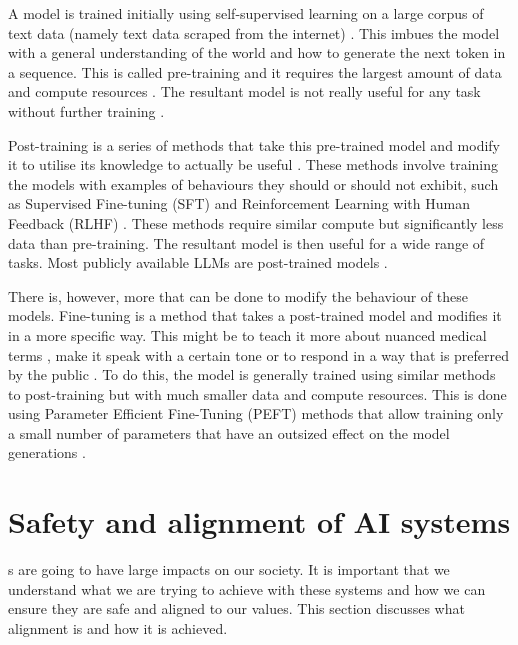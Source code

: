 A model is trained initially using self-supervised learning on a large corpus of text data (namely text data scraped from the internet) \cite{brownLanguageModelsAre2020,Gokaslan2019OpenWeb}. This imbues the model with a general understanding of the world and how to generate the next token in a sequence. This is called pre-training and it requires the largest amount of data and compute resources \cite{kaplanScalingLawsNeural2020}. The resultant model is not really useful for any task without further training \cite{ouyangTrainingLanguageModels2022}.

Post-training is a series of methods that take this pre-trained model and modify it to utilise its knowledge to actually be useful \cite{ouyangTrainingLanguageModels2022}. These methods involve training the models with examples of behaviours they should or should not exhibit, such as Supervised Fine-tuning (SFT) and Reinforcement Learning with Human Feedback (RLHF) \cite{christianoDeepReinforcementLearning2017,baiTrainingHelpfulHarmless2022}. These methods require similar compute but significantly less data than pre-training. The resultant model is then useful for a wide range of tasks. Most publicly available LLMs are post-trained models \cite{zhaoSurveyLargeLanguage2025}. 

There is, however, more that can be done to modify the behaviour of these models. Fine-tuning is a method that takes a post-trained model and modifies it in a more specific way. This might be to teach it more about nuanced medical terms \cite{liChatDoctorMedicalChat2023}, make it speak with a certain tone or to respond in a way that is preferred by the public \cite{nieSurveytoBehaviorDownstreamAlignment2025,suhLanguageModelFineTuning2025}. To do this, the model is generally trained using similar methods to post-training but with much smaller data and compute resources. This is done using Parameter Efficient Fine-Tuning (PEFT) methods that allow training only a small number of parameters that have an outsized effect on the model generations \cite{huLoRALowRankAdaptation2021,dettmersQLoRAEfficientFinetuning2023}.


\section{Safety and alignment of AI systems}
\label{sec:alignment}

s are going to have large impacts on our society. It is important that we understand what we are trying to achieve with these systems and how we can ensure they are safe and aligned to our values. This section discusses what alignment is and how it is achieved.

